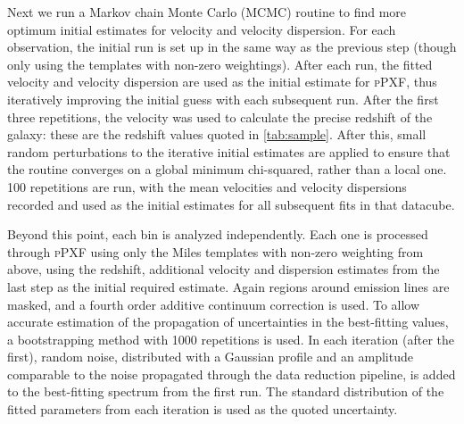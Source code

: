 
		Next we run a Markov chain Monte Carlo (MCMC) routine to find more optimum initial estimates for velocity and velocity dispersion. For each observation, the initial run is set up in the same way as the previous step (though only using the templates with non-zero weightings). After each run, the fitted velocity and velocity dispersion are used as the initial estimate for \textsc{pPXF}, thus iteratively improving the initial guess with each subsequent run. After the first three repetitions, the velocity was used to calculate the precise redshift of the galaxy: these are the redshift values quoted in \ref{tab:sample}. After this, small random perturbations to the iterative initial estimates are applied to ensure that the routine converges on a global minimum chi-squared, rather than a local one. 100 repetitions are run, with the mean velocities and velocity dispersions recorded and used as the initial estimates for all subsequent fits in that datacube. 

		Beyond this point, each bin is analyzed independently. Each one is processed through \textsc{pPXF} using only the Miles templates with non-zero weighting from above, using the redshift, additional velocity and dispersion estimates from the last step as the initial required estimate. Again regions around emission lines are masked, and a fourth order additive continuum correction is used. To allow accurate estimation of the propagation of uncertainties in the best-fitting values, a bootstrapping method with 1000 repetitions is used. In each iteration (after the first), random noise, distributed with a Gaussian profile and an amplitude comparable to the noise propagated through the data reduction pipeline, is added to the best-fitting spectrum from the first run. The standard distribution of the fitted parameters from each iteration is used as the quoted uncertainty.


